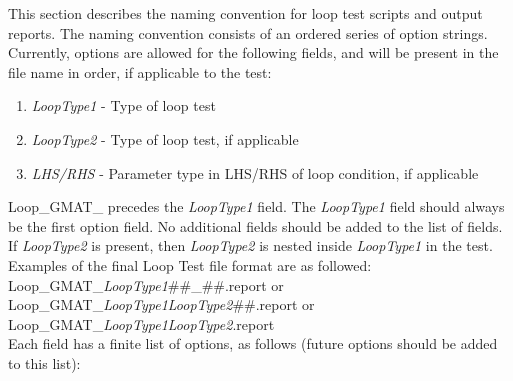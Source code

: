 This section describes the naming convention for loop test scripts
and output reports. The naming convention consists of an ordered
series of option strings. Currently, options are allowed for the
following fields, and will be present in the file name in order, if
applicable to the test:

\begin{enumerate}
  \item \emph{LoopType1} - Type of loop test
  \item \emph{LoopType2} - Type of loop test, if applicable
  \item \emph{LHS/RHS} - Parameter type in LHS/RHS of loop
  condition, if applicable
\end{enumerate}

Loop\_GMAT\_ precedes the \emph{LoopType1} field. The
\emph{LoopType1} field should always be the first option field. No
additional fields should be added to the list of fields. If
\emph{LoopType2} is present, then \emph{LoopType2} is nested inside
\emph{LoopType1} in the test. Examples of the final Loop Test file
format are as followed:\\

Loop\_GMAT\_\emph{LoopType1}\#\#\_\#\#.report or\\
Loop\_GMAT\_\emph{LoopType1}\emph{LoopType2}\#\#.report or\\
Loop\_GMAT\_\emph{LoopType1}\emph{LoopType2}.report\\

Each field has a finite list of options, as follows (future options
should be added to this list):

